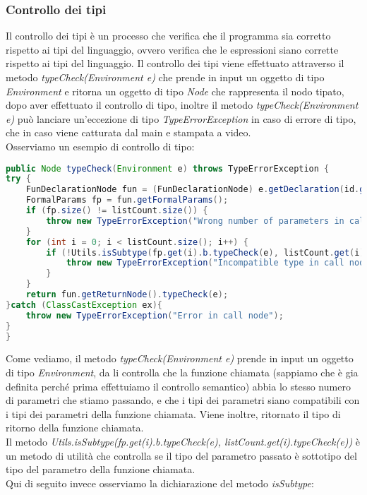 \documentclass[../../main.tex]{subfiles}
\begin{document}
\subsubsection{Controllo dei tipi}
Il controllo dei tipi è un processo che verifica che il programma sia corretto rispetto ai tipi del linguaggio, ovvero verifica che le espressioni siano corrette rispetto ai tipi del linguaggio.
Il controllo dei tipi viene effettuato attraverso il metodo \textit{typeCheck(Environment e)} che prende in input un oggetto di tipo \textit{Environment} e ritorna un oggetto di tipo \textit{Node} che rappresenta il nodo tipato, dopo aver effettuato il controllo di tipo, inoltre il metodo \textit{typeCheck(Environment e)} può lanciare un'eccezione di tipo \textit{TypeErrorException} in caso di errore di tipo, che in caso viene catturata dal main e stampata a video.\\
Osserviamo un esempio di controllo di tipo:
\begin{lstlisting}[language=Java, caption={Controllo di tipo di CallNode}]
public Node typeCheck(Environment e) throws TypeErrorException {
try {
    FunDeclarationNode fun = (FunDeclarationNode) e.getDeclaration(id.getId());
    FormalParams fp = fun.getFormalParams();
    if (fp.size() != listCount.size()) {
        throw new TypeErrorException("Wrong number of parameters in call " + id.getId());
    }
    for (int i = 0; i < listCount.size(); i++) {
        if (!Utils.isSubtype(fp.get(i).b.typeCheck(e), listCount.get(i).typeCheck(e))) {
            throw new TypeErrorException("Incompatible type in call node");
        }
    }
    return fun.getReturnNode().typeCheck(e);
}catch (ClassCastException ex){
    throw new TypeErrorException("Error in call node");
}
}
\end{lstlisting}
Come vediamo, il metodo \textit{typeCheck(Environment e)} prende in input un oggetto di tipo \textit{Environment}, da li controlla che la funzione chiamata (sappiamo che è gia definita perché prima effettuiamo il controllo semantico) abbia lo stesso numero di parametri che stiamo passando, e che i tipi dei parametri siano compatibili con i tipi dei parametri della funzione chiamata.
Viene inoltre, ritornato il tipo di ritorno della funzione chiamata.\\
Il metodo \textit{Utils.isSubtype(fp.get(i).b.typeCheck(e), listCount.get(i).typeCheck(e))} è un metodo di utilità che controlla se il tipo del parametro passato è sottotipo del tipo del parametro della funzione chiamata.\\
Qui di seguito invece osserviamo la dichiarazione del metodo \textit{isSubtype}:
\end{document}
